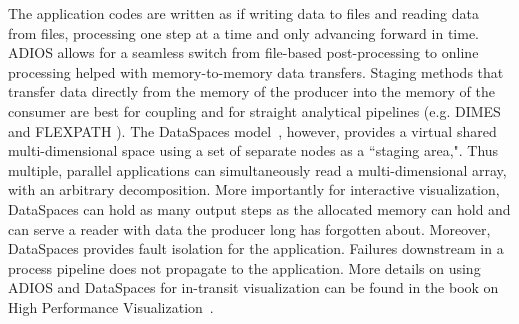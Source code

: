 The application codes are written as if writing data to files and reading data from files, processing one step at a time and only advancing forward in time. ADIOS allows for a seamless switch from file-based post-processing to online processing helped with memory-to-memory data transfers. Staging methods that transfer data directly from the memory of the producer into the memory of the consumer are best for coupling and for straight analytical pipelines (e.g. DIMES \cite{ADIOS:DIMES-XXX} and FLEXPATH \cite{ADIOS:FLEXPATH-XXX}). The DataSpaces model~\cite{ADIOS:Docan:hpdc10}, however, provides a virtual shared multi-dimensional space using a set of separate nodes as a ``staging area,". Thus multiple, parallel applications can simultaneously read a multi-dimensional array, with an arbitrary decomposition. More importantly for interactive visualization, DataSpaces can hold as many output steps as the allocated memory can hold and can serve a reader with data the producer long has forgotten about. Moreover, DataSpaces provides fault isolation for the application. Failures downstream in a process pipeline does not propagate to the application. More details on using ADIOS and DataSpaces for in-transit visualization can be found in the book on High Performance Visualization~\cite{ADIOS:Bethel-Childs-Hansen:HPV:2012}.
